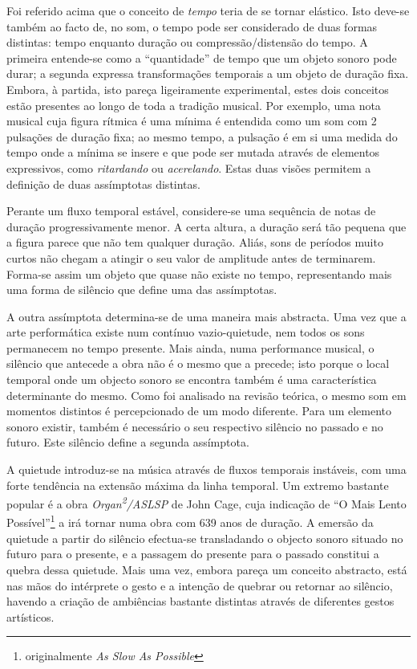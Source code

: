 \documentclass[../main.tex]{subfiles}
\begin{document}

Foi referido acima que o conceito de \textsl{tempo} teria de se tornar elástico. Isto deve-se também ao facto de, no som, o tempo pode ser considerado de duas formas distintas: tempo enquanto duração ou compressão/distensão do tempo. A primeira entende-se como a \enquote{quantidade} de tempo que um objeto sonoro pode durar; a segunda expressa transformações temporais a um objeto de duração fixa. Embora, à partida, isto pareça ligeiramente experimental, estes dois conceitos estão presentes ao longo de toda a tradição musical. Por exemplo, uma nota musical cuja figura rítmica é uma mínima é entendida como um som com 2 pulsações de duração fixa; ao mesmo tempo, a pulsação é em si uma medida do tempo onde a mínima se insere e que pode ser mutada através de elementos expressivos, como \textsl{ritardando} ou \textsl{acerelando}. Estas duas visões permitem a definição de duas assímptotas distintas.

Perante um fluxo temporal estável, considere-se uma sequência de notas de duração progressivamente menor. A certa altura, a duração será tão pequena que a figura parece que não tem qualquer duração. Aliás, sons de períodos muito curtos não chegam a atingir o seu valor de amplitude antes de terminarem\cite{olson}. Forma-se assim um objeto que quase não existe no tempo, representando mais uma forma de silêncio que define uma das assímptotas.

A outra assímptota determina-se de uma maneira mais abstracta. Uma vez que a arte performática existe num contínuo vazio-quietude, nem todos os sons permanecem no tempo presente. Mais ainda, numa performance musical, o silêncio que antecede a obra não é o mesmo que a precede; isto porque o local temporal onde um objecto sonoro se encontra também é uma característica determinante do mesmo. Como foi analisado na revisão teórica, o mesmo som em momentos distintos é percepcionado de um modo diferente\cite{gadamer}. Para um elemento sonoro existir, também é necessário o seu respectivo silêncio no passado e no futuro. Este silêncio define a segunda assímptota.

A quietude introduz-se na música através de fluxos temporais instáveis, com uma forte tendência na extensão máxima da linha temporal. Um extremo bastante popular é a obra \textsl{Organ\textsuperscript{2}/ASLSP} de John Cage, cuja indicação de \enquote{O Mais Lento Possível}\footnote{originalmente \textsl{As Slow As Possible}} a irá tornar numa obra com 639 anos de duração\cite{aslsp}. A emersão da quietude a partir do silêncio efectua-se transladando o objecto sonoro situado no futuro para o presente, e a passagem do presente para o passado constitui a quebra dessa quietude. Mais uma vez, embora pareça um conceito abstracto, está nas mãos do intérprete o gesto e a intenção de quebrar ou retornar ao silêncio, havendo a criação de ambiências bastante distintas através de diferentes gestos artísticos.
\end{document}
